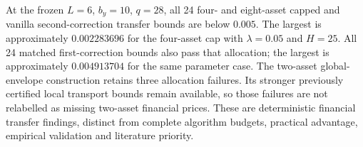 At the frozen $L=6$, $b_y=10$, $q=28$, all 24 four- and eight-asset
capped and vanilla second-correction transfer bounds are below $0.005$.
The largest is approximately $0.002283696$ for the four-asset cap
with $\lambda=0.05$ and $H=25$. All 24 matched first-correction bounds
also pass that allocation; the largest is approximately $0.004913704$
for the same parameter case. The two-asset global-envelope construction
retains three allocation failures. Its stronger previously certified
local transport bounds remain available, so those failures are not
relabelled as missing two-asset financial prices. These are deterministic
financial transfer findings, distinct from complete algorithm budgets,
practical advantage, empirical validation and literature priority.
